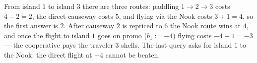From island $1$ to island $3$ there are three routes: paddling $1 \to 2 \to 3$ costs $4 - 2 = 2$, the direct causeway costs $5$, and flying via the Nook costs $3 + 1 = 4$, so the first answer is $2$. After causeway $2$ is repriced to $6$ the Nook route wins at $4$, and once the flight to island $1$ goes on promo ($b_1 := -4$) flying costs $-4 + 1 = -3$ --- the cooperative pays the traveler $3$ shells. The last query asks for island $1$ to the Nook: the direct flight at $-4$ cannot be beaten.
